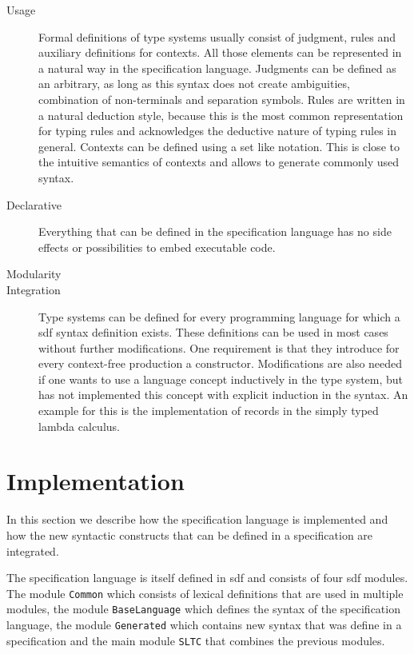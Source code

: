 \begin{description}
\item[Usage] Formal definitions of type systems usually consist of
  judgment, rules and auxiliary definitions for contexts. All those
  elements can be represented in a natural way in the specification
  language. Judgments can be defined as an arbitrary, as long as this
  syntax does not create ambiguities, combination of non-terminals and
  separation symbols. Rules are written in a natural deduction style,
  because this is the most common representation for typing rules and
  acknowledges the deductive nature of typing rules in
  general. Contexts can be defined using a set like notation. This is
  close to the intuitive semantics of contexts and allows to generate
  commonly used syntax.
\item[Declarative] Everything that can be defined in the specification
  language has no side effects or possibilities to embed executable
  code.
\item[Modularity] 
\item[Integration] Type systems can be defined for every programming
  language for which a \gls{sdf} syntax definition exists. These
  definitions can be used in most cases without further
  modifications. One requirement is that they introduce for every
  context-free production a constructor. Modifications are also needed
  if one wants to use a language concept inductively in the type
  system, but has not implemented this concept with explicit induction
  in the syntax. An example for this is the implementation of records
  in the simply typed lambda calculus. 
\end{description}
\section{Implementation}
\label{sec:generate-sdf}
In this section we describe how the specification language is
implemented and how the new syntactic constructs that can be defined
in a specification are integrated.

The specification language is itself defined in \gls{sdf} and consists
of four \gls{sdf} modules. The module \verb|Common| which consists of
lexical definitions that are used in multiple modules, the module
\verb|BaseLanguage| which defines the syntax of the specification
language, the module \verb|Generated| which contains new syntax that
was define in a specification and the main module \verb|SLTC| that
combines the previous modules.

